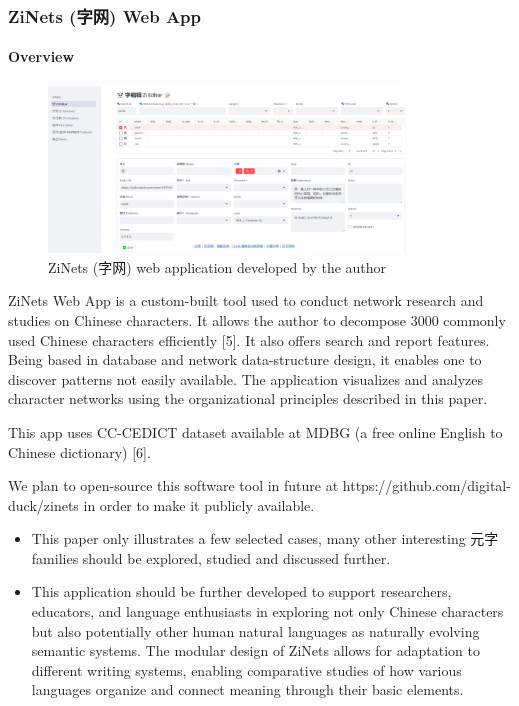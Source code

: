 \documentclass[
  11pt,
  letterpaper,
]{article}
\providecommand{\tightlist}{%
  \setlength{\itemsep}{0pt}\setlength{\parskip}{0pt}}
\begin{document}
\subsubsection{ZiNets (字网) Web App}\label{zinets-ux5b57ux7f51-web-app}

\paragraph{\texorpdfstring{Overview }{Overview  }}\label{overview}

\begin{figure}
\centering
\includegraphics[width=0.85\textwidth]{./images/app_zinets.png}
\caption{ZiNets (字网) web application developed by the author}
\end{figure}

ZiNets Web App is a custom-built tool used to conduct network research
and studies on Chinese characters. It allows the author to decompose
3000 commonly used Chinese characters efficiently {[}5{]}. It also
offers search and report features. Being based in database and network
data-structure design, it enables one to discover patterns not easily
available. The application visualizes and analyzes character networks
using the organizational principles described in this paper.

This app uses CC-CEDICT dataset available at MDBG (a free online English to
Chinese dictionary) {[}6{]}.

We plan to open-source this software tool in future at
https://github.com/digital-duck/zinets in order to make it publicly available.

\begin{itemize}
\tightlist
\item
  This paper only illustrates a few selected cases, many other
  interesting 元字 families should be explored, studied and discussed
  further.
\item
  This application should be further developed to support researchers,
  educators, and language enthusiasts in exploring not only Chinese
  characters but also potentially other human natural languages as
  naturally evolving semantic systems. The modular design of ZiNets
  allows for adaptation to different writing systems, enabling
  comparative studies of how various languages organize and connect
  meaning through their basic elements.
\end{itemize}
\end{document}
